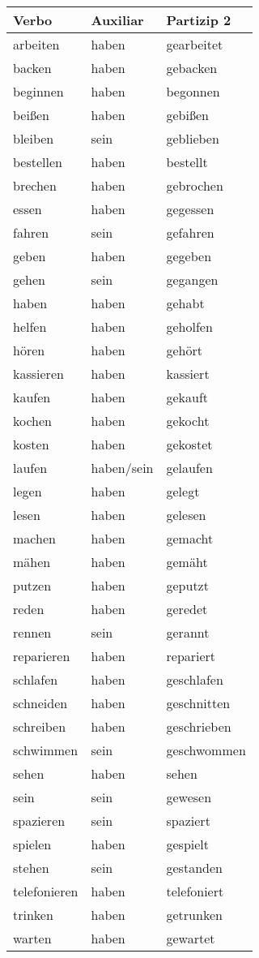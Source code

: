 \begin{tabular}{| l | l | l |}
\hline
\textbf{Verbo} & \textbf{Auxiliar} & \textbf{Partizip 2} \\
\hline
arbeiten & haben & gearbeitet \\
backen & haben & gebacken \\
beginnen & haben & begonnen \\
beißen & haben & gebißen \\
bleiben & sein & geblieben \\
bestellen & haben & bestellt \\
brechen & haben & gebrochen \\
essen & haben & gegessen \\
fahren & sein & gefahren \\
geben & haben & gegeben \\
gehen & sein & gegangen \\
haben & haben & gehabt \\
helfen & haben & geholfen \\
hören & haben & gehört \\
kassieren & haben & kassiert \\
kaufen & haben & gekauft \\
kochen & haben & gekocht \\
kosten & haben & gekostet \\
laufen & haben/sein & gelaufen \\
legen & haben & gelegt \\
lesen & haben & gelesen \\
machen & haben & gemacht \\
mähen & haben & gemäht \\
putzen & haben & geputzt \\
reden & haben & geredet \\
rennen & sein & gerannt \\
reparieren & haben & repariert \\
schlafen & haben & geschlafen \\
schneiden & haben & geschnitten \\
schreiben & haben & geschrieben \\
schwimmen & sein & geschwommen \\
sehen & haben & sehen \\
sein & sein & gewesen \\
spazieren & sein & spaziert \\
spielen & haben & gespielt \\
stehen & sein & gestanden \\
telefonieren & haben & telefoniert \\
trinken & haben & getrunken \\
warten & haben & gewartet \\
\hline
\end{tabular}


